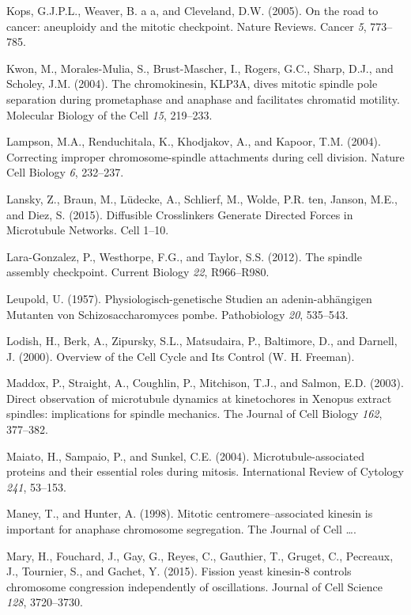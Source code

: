 \documentclass[12pt,a4paper,twoside,openright]{book}
\begin{document}
\hypertarget{ref-Kops2005}{}
Kops, G.J.P.L., Weaver, B. a a, and Cleveland, D.W. (2005). On the road
to cancer: aneuploidy and the mitotic checkpoint. Nature Reviews. Cancer
\emph{5}, 773--785.

\hypertarget{ref-Kwon2004}{}
Kwon, M., Morales-Mulia, S., Brust-Mascher, I., Rogers, G.C., Sharp,
D.J., and Scholey, J.M. (2004). The chromokinesin, KLP3A, dives mitotic
spindle pole separation during prometaphase and anaphase and facilitates
chromatid motility. Molecular Biology of the Cell \emph{15}, 219--233.

\hypertarget{ref-Lampson2004}{}
Lampson, M.A., Renduchitala, K., Khodjakov, A., and Kapoor, T.M. (2004).
Correcting improper chromosome-spindle attachments during cell division.
Nature Cell Biology \emph{6}, 232--237.

\hypertarget{ref-Lansky2015}{}
Lansky, Z., Braun, M., Lüdecke, A., Schlierf, M., Wolde, P.R. ten,
Janson, M.E., and Diez, S. (2015). Diffusible Crosslinkers Generate
Directed Forces in Microtubule Networks. Cell 1--10.

\hypertarget{ref-Lara-Gonzalez2012}{}
Lara-Gonzalez, P., Westhorpe, F.G., and Taylor, S.S. (2012). The spindle
assembly checkpoint. Current Biology \emph{22}, R966--R980.

\hypertarget{ref-Leupold1957}{}
Leupold, U. (1957). Physiologisch-genetische Studien an
adenin-abhängigen Mutanten von Schizosaccharomyces pombe. Pathobiology
\emph{20}, 535--543.

\hypertarget{ref-Lodish2000}{}
Lodish, H., Berk, A., Zipursky, S.L., Matsudaira, P., Baltimore, D., and
Darnell, J. (2000). Overview of the Cell Cycle and Its Control (W. H.
Freeman).

\hypertarget{ref-Maddox2003}{}
Maddox, P., Straight, A., Coughlin, P., Mitchison, T.J., and Salmon,
E.D. (2003). Direct observation of microtubule dynamics at kinetochores
in Xenopus extract spindles: implications for spindle mechanics. The
Journal of Cell Biology \emph{162}, 377--382.

\hypertarget{ref-Maiato2004}{}
Maiato, H., Sampaio, P., and Sunkel, C.E. (2004). Microtubule-associated
proteins and their essential roles during mitosis. International Review
of Cytology \emph{241}, 53--153.

\hypertarget{ref-Maney1998}{}
Maney, T., and Hunter, A. (1998). Mitotic centromere--associated kinesin
is important for anaphase chromosome segregation. The Journal of Cell
\ldots{}.

\hypertarget{ref-Mary2015}{}
Mary, H., Fouchard, J., Gay, G., Reyes, C., Gauthier, T., Gruget, C.,
Pecreaux, J., Tournier, S., and Gachet, Y. (2015). Fission yeast
kinesin-8 controls chromosome congression independently of oscillations.
Journal of Cell Science \emph{128}, 3720--3730.
\end{document}
